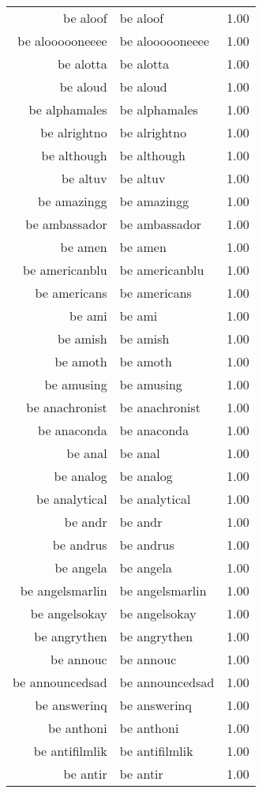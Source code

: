 \begin{table}[ht]
\begin{tabular}{rlr}
  be aloof & be aloof & 1.00 \\ 
  be aloooooneeee & be aloooooneeee & 1.00 \\ 
  be alotta & be alotta & 1.00 \\ 
  be aloud & be aloud & 1.00 \\ 
  be alphamales & be alphamales & 1.00 \\ 
  be alrightno & be alrightno & 1.00 \\ 
  be although & be although & 1.00 \\ 
  be altuv & be altuv & 1.00 \\ 
  be amazingg & be amazingg & 1.00 \\ 
  be ambassador & be ambassador & 1.00 \\ 
  be amen & be amen & 1.00 \\ 
  be americanblu & be americanblu & 1.00 \\ 
  be americans & be americans & 1.00 \\ 
  be ami & be ami & 1.00 \\ 
  be amish & be amish & 1.00 \\ 
  be amoth & be amoth & 1.00 \\ 
  be amusing & be amusing & 1.00 \\ 
  be anachronist & be anachronist & 1.00 \\ 
  be anaconda & be anaconda & 1.00 \\ 
  be anal & be anal & 1.00 \\ 
  be analog & be analog & 1.00 \\ 
  be analytical & be analytical & 1.00 \\ 
  be andr & be andr & 1.00 \\ 
  be andrus & be andrus & 1.00 \\ 
  be angela & be angela & 1.00 \\ 
  be angelsmarlin & be angelsmarlin & 1.00 \\ 
  be angelsokay & be angelsokay & 1.00 \\ 
  be angrythen & be angrythen & 1.00 \\ 
  be annouc & be annouc & 1.00 \\ 
  be announcedsad & be announcedsad & 1.00 \\ 
  be answerinq & be answerinq & 1.00 \\ 
  be anthoni & be anthoni & 1.00 \\ 
  be antifilmlik & be antifilmlik & 1.00 \\ 
  be antir & be antir & 1.00 \\ 

\end{tabular}
\end{table}
